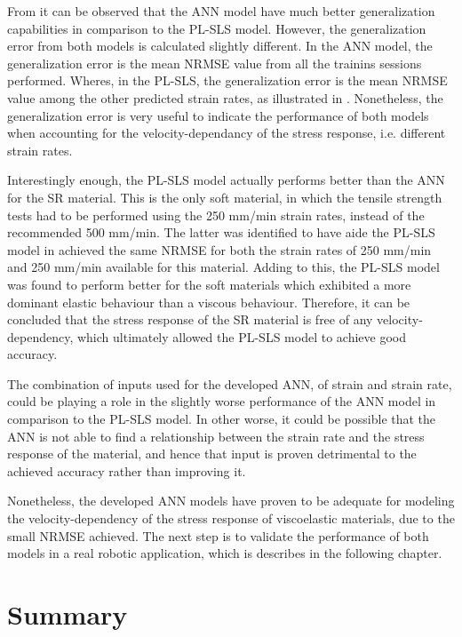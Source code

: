 From  it can be observed that the ANN model have much better generalization capabilities in comparison to the PL-SLS model. However, the generalization error from both models is calculated slightly different. In the ANN model, the generalization error is the mean NRMSE value from all the trainins sessions performed. Wheres, in the PL-SLS, the generalization error is the mean NRMSE value among the other predicted strain rates, as illustrated in . Nonetheless, the generalization error is very useful to indicate the performance of both models when accounting for the velocity-dependancy of the stress response, i.e. different strain rates.

Interestingly enough, the PL-SLS model actually performs better than the ANN for the SR material. This is the only soft material, in which the tensile strength tests had to be performed using the 250 mm/min strain rates, instead of the recommended 500 mm/min. The latter was identified to have aide the PL-SLS model in achieved the same NRMSE for both the strain rates of 250 mm/min and 250 mm/min available for this material. Adding to this, the PL-SLS model was found to perform better for the soft materials which exhibited a more dominant elastic behaviour than a viscous behaviour. Therefore, it can be concluded that the stress response of the SR material is free of any velocity-dependency, which ultimately allowed the PL-SLS model to achieve good accuracy. 

The combination of inputs used for the developed ANN, of strain and strain rate, could be playing a role in the slightly worse performance of the ANN model in comparison to the PL-SLS model. In other worse, it could be possible that the ANN is not able to find a relationship between the strain rate and the stress response of the material, and hence that input is proven detrimental to the achieved accuracy rather than improving it.

Nonetheless, the developed ANN models have proven to be adequate for modeling the velocity-dependency of the stress response of viscoelastic materials, due to the small NRMSE achieved. The next step is to validate the performance of both models in a real robotic application, which is describes in the following chapter.

\section{Summary}

